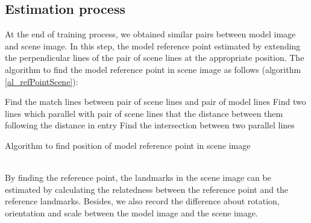 \subsection{Estimation process}
At the end of training process, we obtained similar pairs between model image and scene image. In this step, the model reference point estimated by extending the perpendicular lines of the pair of scene lines at the appropriate position. The algorithm to find the model reference point in scene image as follows (algorithm \ref{al_refPointScene}): \\[0.2cm]
\begin{algorithm}[H]
\Indm 
{}
\SetAlgoLined
{}
\Indp
Find the match lines between pair of scene lines and pair of model lines\;
Find two lines which parallel with pair of scene lines that the distance between them following the distance in entry\;
Find the intersection between two parallel lines\;
\caption{Algorithm to find position of model reference point in scene image}
\label{al_refPointScene}
\end{algorithm}~\\[0.2cm]
By finding the reference point, the landmarks in the scene image can be estimated by calculating the relatedness between the reference point and the reference landmarks. Besides, we also record the difference about rotation, orientation and scale between the model image and the scene image.

